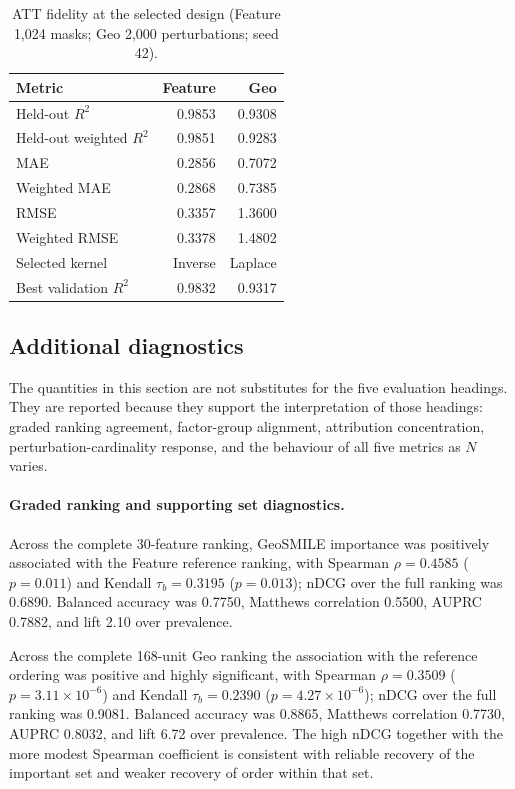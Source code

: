 \begin{table}[H]
\centering
\caption{ATT fidelity at the selected design (Feature 1,024 masks; Geo 2,000 perturbations; seed 42).}
\label{tab:hull_fidelity_selected}
\small
\begin{tabularx}{\textwidth}{X r r}
\toprule
Metric & Feature & Geo \\
\midrule
Held-out $R^2$ & 0.9853 & 0.9308 \\
Held-out weighted $R^2$ & 0.9851 & 0.9283 \\
MAE & 0.2856 & 0.7072 \\
Weighted MAE & 0.2868 & 0.7385 \\
RMSE & 0.3357 & 1.3600 \\
Weighted RMSE & 0.3378 & 1.4802 \\
Selected kernel & Inverse & Laplace \\
Best validation $R^2$ & 0.9832 & 0.9317 \\
\bottomrule
\end{tabularx}
\end{table}

\subsection{Additional diagnostics}
\label{sec:hull_additional_metrics}

The quantities in this section are not substitutes for the five evaluation headings. They are reported because they support the interpretation of those headings: graded ranking agreement, factor-group alignment, attribution concentration, perturbation-cardinality response, and the behaviour of all five metrics as $N$ varies.

\paragraph{Graded ranking and supporting set diagnostics.}
Across the complete 30-feature ranking, GeoSMILE importance was positively associated with the Feature reference ranking, with Spearman $\rho=0.4585$ ($p=0.011$) and Kendall $\tau_b=0.3195$ ($p=0.013$); nDCG over the full ranking was 0.6890. Balanced accuracy was 0.7750, Matthews correlation 0.5500, AUPRC 0.7882, and lift 2.10 over prevalence.

Across the complete 168-unit Geo ranking the association with the reference ordering was positive and highly significant, with Spearman $\rho=0.3509$ ($p=3.11\times10^{-6}$) and Kendall $\tau_b=0.2390$ ($p=4.27\times10^{-6}$); nDCG over the full ranking was 0.9081. Balanced accuracy was 0.8865, Matthews correlation 0.7730, AUPRC 0.8032, and lift 6.72 over prevalence. The high nDCG together with the more modest Spearman coefficient is consistent with reliable recovery of the important set and weaker recovery of order within that set.

